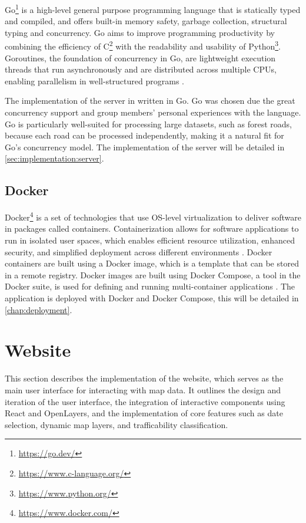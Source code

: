 Go\footnote{\url{https://go.dev/}} is a high-level general purpose programming language that is statically typed and compiled, and offers built-in memory safety, garbage collection, structural typing and concurrency. Go aims to improve programming productivity by combining the efficiency of C\footnote{\url{https://www.c-language.org/}} with the readability and usability of Python\footnote{\url{https://www.python.org/}}. Goroutines, the foundation of concurrency in Go, are lightweight execution threads that run asynchronously and are distributed across multiple CPUs, enabling parallelism in well-structured programs \cite{goproglanguage}.

The implementation of the server in written in Go. Go was chosen due the great concurrency support and group members' personal experiences with the language. Go is particularly well-suited for processing large datasets, such as forest roads, because each road can be processed independently, making it a natural fit for Go's concurrency model. The implementation of the server will be detailed in \autoref{sec:implementation:server}.

\subsection{Docker}\label{subsec:implementation:technologies:docker}

Docker\footnote{\url{https://www.docker.com/}} is a set of technologies that use OS-level virtualization to deliver software in packages called containers. Containerization allows for software applications to run in isolated user spaces, which enables efficient resource utilization, enhanced security, and simplified deployment across different environments \cite{containerizationwikipedia}\cite{dockerwikipedia}. Docker containers are built using a Docker image, which is a template that can be stored in a remote registry. Docker images are built using 
Docker Compose, a tool in the Docker suite, is used for defining and running multi-container applications \cite{dockercomposedocs}. The application is deployed with Docker and Docker Compose, this will be detailed in \autoref{chap:deployment}.

\section{Website}

This section describes the implementation of the website, which serves as the main user interface for interacting with map data. It outlines the design and iteration of the user interface, the integration of interactive components using React and OpenLayers, and the implementation of core features such as date selection, dynamic map layers, and trafficability classification.


